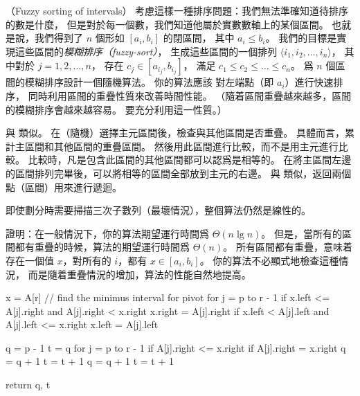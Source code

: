 \startPROBLEM
（Fuzzy sorting of intervals）
考慮這樣一種排序問題：我們無法準確知道待排序的數是什麼，
但是對於每一個數，我們知道他屬於實數數軸上的某個區間。
也就是說，我們得到了 $n$ 個形如 $[a_i,b_i]$ 的閉區間，
其中 $a_i\le b_i$。
我們的目標是實現這些區間的\emph{模糊排序（fuzzy-sort）}，
生成這些區間的一個排列 $\langle i_1,i_2,\ldots,i_n\rangle$，
其中對於 $j=1,2,\ldots,n$，
存在 $c_j \in [a_{i_j}, b_{i_j}]$，
滿足 $c_1\le c_2\le\ldots\le c_n$。
\startigBase[a]\startitem
爲 $n$ 個區間的模糊排序設計一個隨機算法。
你的算法應該
對左端點（即 $a_i$）進行快速排序，
同時利用區間的重疊性質來改善時間性能。
（隨着區間重疊越來越多，區間的模糊排序會越來越容易。
要充分利用這一性質。）
\stopitem\stopigBase

\startANSWER
與 類似。
在（隨機）選擇主元區間後，檢查與其他區間是否重疊。
具體而言，累計主區間和其他區間的重疊區間。
然後用此區間進行比較，而不是用主元進行比較。
比較時，凡是包含此區間的其他區間都可以認爲是相等的。
在將主區間左邊的區間排列完畢後，可以將相等的區間全部放到主元的右邊。
與 類似，返回兩個點（區間）用來進行遞迴。

即使劃分時需要掃描三次子數列（最壞情況），整個算法仍然是線性的。
\stopANSWER

\startigBase[a,continue]\startitem
證明：在一般情況下，你的算法期望運行時間爲 $\Theta(n\lg{n})$。
但是，當所有的區間都有重疊的時候，算法的期望運行時間爲 $\Theta(n)$。
所有區間都有重疊，意味着存在一個值 $x$，對所有的 $i$，都有 $x\in [a_i,b_i]$。
你的算法不必顯式地檢查這種情況，
而是隨着重疊情況的增加，算法的性能自然地提高。
\stopitem\stopigBase

\startANSWER
{}
\startCLRSCODE
x = A[r]
// find the minimus interval for pivot
for j = p to r - 1
	if x.left <= A[j].right and A[j].right < x.right
		x.right = A[j].right
	if x.left < A[j].left and A[j].left <= x.right
		x.left = A[j].left

q = p - 1
t = q
for j = p to r - 1
	if A[j].right <= x.right
		if A[j].right = x.right
			q = q + 1
		t = t + 1
q = q + 1
t = t + 1

return q, t
\stopCLRSCODE
\stopANSWER

\stopPROBLEM
